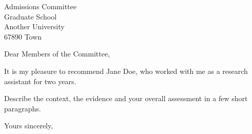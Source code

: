 \documentclass[paper=a4, fontsize=11pt, parskip=half, fromalign=right, fromrule=aftername]{scrlttr2}
\begin{document}
\begin{letter}{Admissions Committee\\Graduate School\\Another University\\67890 Town}
\opening{Dear Members of the Committee,}

It is my pleasure to recommend Jane Doe, who worked with me as a research assistant for two years.

Describe the context, the evidence and your overall assessment in a few short paragraphs.

\closing{Yours sincerely,}
\end{letter}
\end{document}
